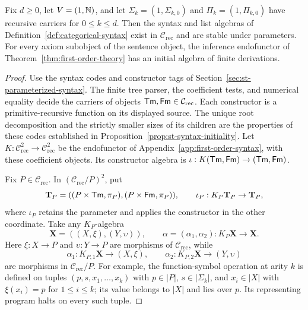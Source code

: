 \begin{proposition}\label{prop:arithmetic-theory-realization}
Fix $d\ge0$, let $V=(1,\mathbb N)$, and let
$\Sigma_k=(1,\Sigma_{k,0})$ and $\Pi_k=(1,\Pi_{k,0})$
have recursive carriers for $0\le k\le d$. Then the
syntax and list algebras of Definition~\ref{def:categorical-syntax}
exist in $\mathcal C_{\mathrm{rec}}$ and are stable under parameters.
For every axiom subobject of the sentence object, the inference
endofunctor of Theorem~\ref{thm:first-order-theory} has an initial
algebra of finite derivations.
\end{proposition}
\begin{proof}
Use the syntax codes and constructor tags of
Section~\ref{sec:st-parameterized-syntax}. The finite tree parser,
the coefficient tests, and numerical equality decide the carriers
of objects $\mathsf{Tm},\mathsf{Fm}\in\mathcal C_{\mathrm{rec}}$. Each constructor is a primitive-recursive
function on its displayed source. The unique root decomposition
and the strictly smaller sizes of its children are the properties
of these codes established in Proposition~\ref{prop:st-syntax-initiality}.
Let $K:\mathcal C_{\mathrm{rec}}^2\to\mathcal C_{\mathrm{rec}}^2$
be the endofunctor of Appendix~\ref{app:first-order-syntax}, with
these coefficient objects. Its constructor algebra is
$\iota:K(\mathsf{Tm},\mathsf{Fm})\to(\mathsf{Tm},\mathsf{Fm})$.

Fix $P\in\mathcal C_{\mathrm{rec}}$. In
$(\mathcal C_{\mathrm{rec}}/P)^2$, put
\[
 \mathbf T_P=((P\times\mathsf{Tm},\pi_P),(P\times\mathsf{Fm},\pi_P)),
 \qquad \iota_P:K_P\mathbf T_P\to\mathbf T_P,
\]
where $\iota_P$ retains the parameter and applies the constructor
in the other coordinate. Take any $K_P$-algebra
\[
 \mathbf X=((X,\xi),(Y,\upsilon)),\qquad
 \alpha=(\alpha_1,\alpha_2):K_P\mathbf X\to\mathbf X.
\]
Here $\xi:X\to P$ and $\upsilon:Y\to P$ are morphisms of
$\mathcal C_{\mathrm{rec}}$, while
\[
 \alpha_1:K_{P,1}\mathbf X\to(X,\xi),\qquad
 \alpha_2:K_{P,2}\mathbf X\to(Y,\upsilon)
\]
are morphisms in $\mathcal C_{\mathrm{rec}}/P$.
For example, the function-symbol operation at arity $k$ is defined
on tuples $(p,s,x_1,\ldots,x_k)$ with $p\in|P|$,
$s\in|\Sigma_k|$, and $x_i\in|X|$ with $\xi(x_i)=p$
for $1\le i\le k$; its value belongs to $|X|$ and lies
over $p$. Its representing program halts on every such tuple.


\end{proof}
